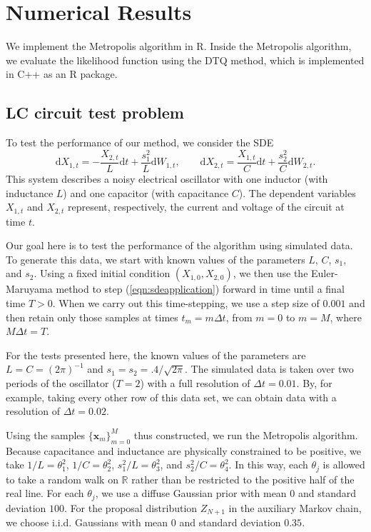 \documentclass[graybox]{svmult}
\begin{document}
\section{Numerical Results}
\label{sec:3}

We implement the Metropolis algorithm in R. Inside the Metropolis algorithm, we evaluate the  likelihood function using the DTQ method, which is implemented in C++ as an R package. 

\subsection{LC circuit test problem}
\label{subsec:3-1}
To test the performance of our method, we consider the SDE
\begin{equation}
\label{eqn:sdeapplication}
\mathrm{d}X_{1,t} =  -\frac{X_{2,t}}{L}\mathrm{d}t + \frac{s_1^2}{L} \mathrm{d}W_{1,t}, \qquad
\mathrm{d}X_{2,t} = \frac{X_{1,t}}{C}\mathrm{d}t + \frac{s_2^2}{C} \mathrm{d}W_{2,t}.
\end{equation}
This system describes a noisy electrical oscillator with one inductor (with inductance $L$) and one capacitor (with capacitance $C$).  The dependent variables $X_{1,t}$ and $X_{2,t}$ represent, respectively, the current and voltage of the circuit at time $t$.

Our goal here is to test the performance of the algorithm using simulated data.  To generate this data, we start with known values of the parameters $L$, $C$, $s_1$, and $s_2$.  Using a fixed initial condition $(X_{1,0},X_{2,0})$, we then use the Euler-Maruyama method to step (\ref{eqn:sdeapplication}) forward in time until a final time $T > 0$.  When we carry out this time-stepping, we use a step size of $0.001$ and then retain only those samples at times $t_m = m \Delta t$, from $m = 0$ to $m = M$, where $M \Delta t = T$.

For the tests presented here, the known values of the parameters are $L = C = (2 \pi)^{-1}$ and $s_1 =  s_2 = .4/\sqrt{2 \pi}$.  The simulated data is taken over two periods of the oscillator ($T = 2$) with a full resolution of $\Delta t = 0.01$.  By, for example, taking every other row of this data set, we can obtain data with a resolution of $\Delta t = 0.02$.

Using the samples $\{ \mathbf{x}_m \}_{m=0}^M$ thus constructed, we run the Metropolis algorithm. 
Because capacitance and inductance are physically constrained to be positive, we take $1/L = \theta_1^2$, $1/C = \theta_2^2$, $s_1^2/L = \theta_3^2$, and $s_2^2/C = \theta_4^2$.  In this way, each $\theta_j$ is allowed to take a random walk on $\mathbb{R}$ rather than be restricted to the positive half of the real line.  For each $\theta_j$, we use a diffuse Gaussian prior with mean $0$ and standard deviation $100$.  For the proposal distribution $Z_{N+1}$ in the auxiliary Markov chain, we choose i.i.d. Gaussians with mean $0$ and standard deviation $0.35$.
\end{document}
